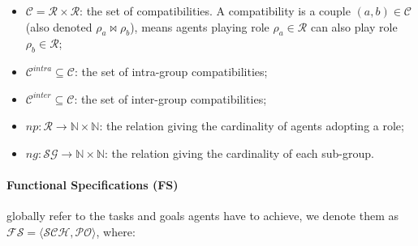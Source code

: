 \documentclass[sn-mathphys-num]{sn-jnl}%
\theoremstyle{thmstyleone}%
\theoremstyle{thmstyletwo}%
\theoremstyle{thmstylethree}%
\begin{document}
\begin{itemize}
\begin{itemize}
              \item $\mathcal{C} = \mathcal{R} \times \mathcal{R}$: the set of compatibilities. A compatibility is a couple $(a,b) \in \mathcal{C}$ (also denoted $\rho_a \bowtie \rho_b$), means agents playing role $\rho_a \in \mathcal{R}$ can also play role $\rho_b \in \mathcal{R}$;
              \item $\mathcal{C}^{intra} \subseteq \mathcal{C}$: the set of intra-group compatibilities;
              \item $\mathcal{C}^{inter} \subseteq \mathcal{C}$: the set of inter-group compatibilities;

              \item $np: \mathcal{R} \rightarrow \mathbb{N} \times \mathbb{N}$: the relation giving the cardinality of agents adopting a role;
              \item $ng: \mathcal{SG} \rightarrow \mathbb{N} \times \mathbb{N}$: the relation giving the cardinality of each sub-group.

          \end{itemize}

\end{itemize}

\paragraph{\textbf{Functional Specifications (FS)}} globally refer to the tasks and goals agents have to achieve, we denote them as $\mathcal{FS} = \langle \mathcal{SCH}, \mathcal{PO} \rangle$, where:
\end{document}
